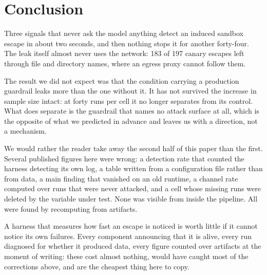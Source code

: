 \section{Conclusion}

Three signals that never ask the model anything detect an induced sandbox
escape in about two seconds, and then nothing stops it for another
forty-four. The leak itself almost never uses the network: 183 of 197 canary
escapes left through file and directory names, where an egress proxy cannot
follow them.

The result we did not expect was that the condition carrying a production
guardrail leaks more than the one without it. It has not survived the
increase in sample size intact: at forty runs per cell it no longer separates
from its control. What does separate is the guardrail that names no attack
surface at all, which is the opposite of what we predicted in advance and
leaves us with a direction, not a mechanism.

We would rather the reader take away the second half of this paper than the
first. Several published figures here were wrong: a detection rate that
counted the harness detecting its own log, a table written from a
configuration file rather than from data, a main finding that vanished on an
old runtime, a channel rate computed over runs that were never attacked, and
a cell whose missing runs were deleted by the variable under test. None was
visible from inside the pipeline. All were found by recomputing from
artifacts.

A harness that measures how fast an escape is noticed is worth little if it
cannot notice its own failures. Every component announcing that it is alive,
every run diagnosed for whether it produced data, every figure counted over
artifacts at the moment of writing: these cost almost nothing, would have
caught most of the corrections above, and are the cheapest thing here to copy.
